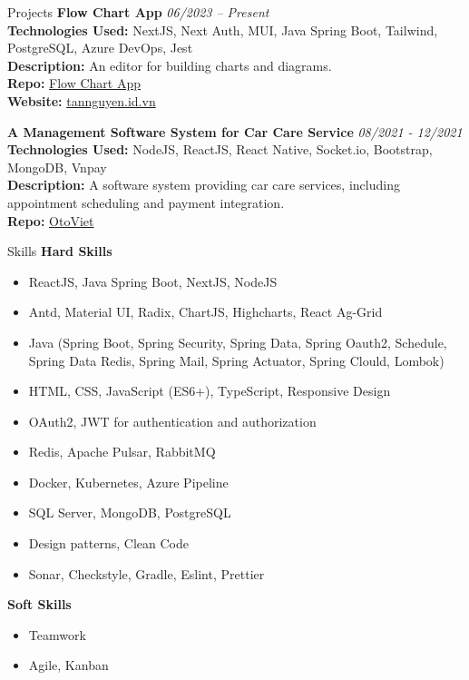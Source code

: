 \documentclass{resume} %
\begin{document}
\begin{rSection}{Projects}
{\bf Flow Chart App} \hfill {\em 06/2023 – Present}
\\ \textbf{Technologies Used:} NextJS, Next Auth, MUI, Java Spring Boot, Tailwind, PostgreSQL, Azure DevOps, Jest
\\ \textbf{Description:} An editor for building charts and diagrams.
\\ \textbf{Repo:} \href{https://dev.azure.com/nhattan1506/Public-Project/_git/flow-chart-app}{Flow Chart App} \\
\textbf{Website:} \href{https://tannguyen.id.vn}{tannguyen.id.vn}

\vspace{0.2cm} %

{\bf A Management Software System for Car Care Service} \hfill {\em 08/2021 - 12/2021}
\\ \textbf{Technologies Used:} NodeJS, ReactJS, React Native, Socket.io, Bootstrap, MongoDB, Vnpay
\\ \textbf{Description:} A software system providing car care services, including appointment scheduling and payment integration.
\\ \textbf{Repo:} \href{https://github.com/OtoViet}{OtoViet}
\end{rSection}


\begin{rSection}{Skills}
{\bf Hard Skills}
\begin{itemize}
    \item ReactJS, Java Spring Boot, NextJS, NodeJS
    \item Antd, Material UI, Radix, ChartJS, Highcharts, React Ag-Grid
    \item Java (Spring Boot, Spring Security, Spring Data, Spring Oauth2, Schedule, Spring Data Redis, Spring Mail, Spring Actuator, Spring Clould, Lombok)
    \item HTML, CSS, JavaScript (ES6+), TypeScript, Responsive Design
    \item OAuth2, JWT for authentication and authorization
    \item Redis, Apache Pulsar, RabbitMQ
    \item Docker, Kubernetes, Azure Pipeline
    \item SQL Server, MongoDB, PostgreSQL
    \item Design patterns, Clean Code
    \item Sonar, Checkstyle, Gradle, Eslint, Prettier
\end{itemize}

{\bf Soft Skills}
\begin{itemize}
    \item Teamwork
    \item Agile, Kanban
\end{itemize}
\end{rSection}
\end{document}

